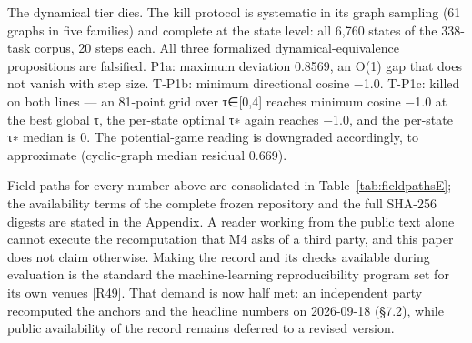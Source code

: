 \documentclass[11pt,a4paper]{article}
\begin{document}
The dynamical tier dies. The kill protocol is systematic in its graph sampling (61 graphs in five families) and complete at the state level: all 6,760 states of the 338-task corpus, 20 steps each. All three formalized dynamical-equivalence propositions are falsified. P1a: maximum deviation 0.8569, an O(1) gap that does not vanish with step size. T-P1b: minimum directional cosine −1.0. T-P1c: killed on both lines — an 81-point grid over τ∈[0,4] reaches minimum cosine −1.0 at the best global τ, the per-state optimal τ∗ again reaches −1.0, and the per-state τ∗ median is 0. The potential-game reading is downgraded accordingly, to approximate (cyclic-graph median residual 0.669).

Field paths for every number above are consolidated in Table~\ref{tab:fieldpathsE}; the availability terms of the complete frozen repository and the full SHA-256 digests are stated in the Appendix. A reader working from the public text alone cannot execute the recomputation that M4 asks of a third party, and this paper does not claim otherwise. Making the record and its checks available during evaluation is the standard the machine-learning reproducibility program set for its own venues [R49]. That demand is now half met: an independent party recomputed the anchors and the headline numbers on 2026-09-18 (§7.2), while public availability of the record remains deferred to a revised version.
\end{document}
